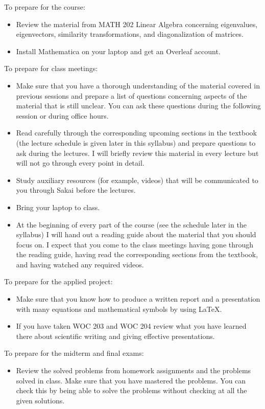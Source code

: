\documentclass[11pt]{article}
\begin{document}
To prepare for the course:
\begin{itemize}[label={-},noitemsep]
\item Review the material from MATH 202 Linear Algebra concerning eigenvalues, eigenvectors, similarity transformations, and diagonalization of matrices.
\item Install Mathematica on your laptop and get an Overleaf account.
\end{itemize}

To prepare for class meetings:
\begin{itemize}[label={-},noitemsep]
\item Make sure that you have a thorough understanding of the material covered in previous sessions and prepare a list of questions concerning aspects of the material that is still unclear. You can ask these questions during the following session or during office hours.
\item Read carefully through the corresponding upcoming sections in the textbook (the lecture schedule is given later in this syllabus) and prepare questions to ask during the lectures. I will briefly review this material in every lecture but will not go through every point in detail.  
\item Study auxiliary resources (for example, videos) that will be communicated to you through Sakai before the lectures.
\item Bring your laptop to class.
\item At the beginning of every part of the course (see the schedule later in the syllabus) I will hand out a reading guide about the material that you should focus on. I expect that you come to the class meetings having gone through the reading guide, having read the corresponding sections from the textbook, and having watched any required videos.
\end{itemize}

To prepare for the applied project:
\begin{itemize}[label={-},noitemsep]
\item Make sure that you know how to produce a written report and a presentation with many equations and mathematical symbols by using LaTeX.
\item If you have taken WOC 203 and WOC 204 review what you have learned there about scientific writing and giving effective presentations.
\end{itemize}

To prepare for the midterm and final exams:
\begin{itemize}[label={-},noitemsep]
\item Review the solved problems from homework assignments and the problems solved in class. Make sure that you have mastered the problems. You can check this by being able to solve the problems without checking at all the given solutions.
\end{itemize}
\end{document}
